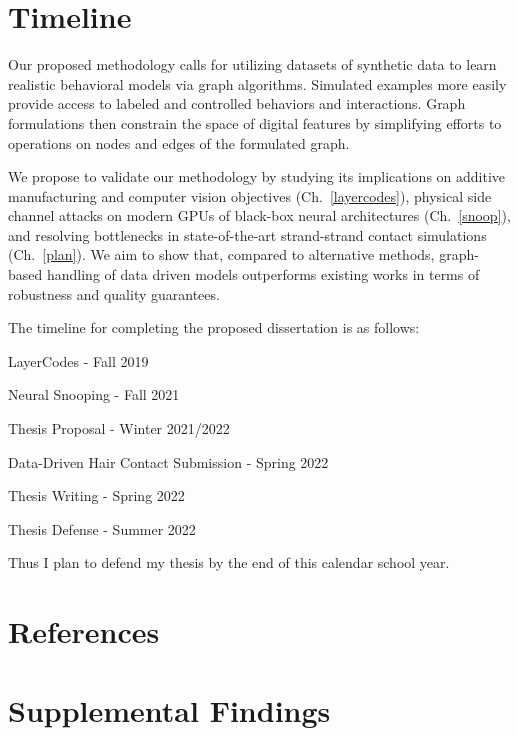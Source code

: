 \documentclass[12pt]{report}
\newcommand{\cmark}{\ding{51}}%
\newcommand{\done}{\rlap{$\square$}{\raisebox{2pt}{\large\hspace{1pt}\cmark}}\hspace{-2.5pt}}
\begin{document}
\chapter{Timeline}\label{sec:hair_plan}

Our proposed methodology calls for utilizing datasets 
of synthetic data to learn realistic behavioral models via graph algorithms. 
Simulated examples more easily provide access to labeled and controlled behaviors and interactions.
Graph formulations then constrain the space of digital features by
simplifying efforts to operations on nodes and edges of the formulated graph.

We propose to validate our methodology by studying 
its implications on additive manufacturing and computer vision objectives (Ch.~\ref{layercodes}), 
physical side channel attacks on modern GPUs of black-box neural architectures (Ch.~\ref{snoop}), 
and resolving bottlenecks in state-of-the-art strand-strand contact simulations (Ch.~\ref{plan}).
We aim to show that, compared to alternative methods, graph-based 
handling of data driven models outperforms existing works 
in terms of robustness and quality guarantees.

The timeline for completing the proposed dissertation is as follows:
\begin{todolist}
    \item[\done] LayerCodes - Fall 2019
    \item[\done] Neural Snooping - Fall 2021
    \item Thesis Proposal - Winter 2021/2022
    \item Data-Driven Hair Contact Submission - Spring 2022
    \item Thesis Writing - Spring 2022
    \item Thesis Defense - Summer 2022
\end{todolist}
Thus I plan to defend my thesis by the end of this calendar school year.

\chapter{References}\label{references}
\printbibliography[heading=none]

\vspace{-20mm}
\appendix
\chapter{\vspace{-8mm}Supplemental Findings}
\end{document}
